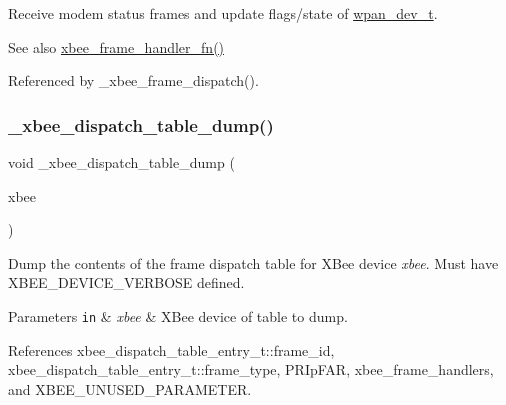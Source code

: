 Receive modem status frames and update flags/state of \hyperlink{structwpan__dev__t}{wpan\+\_\+dev\+\_\+t}. 

\begin{DoxySeeAlso}{See also}
\hyperlink{group__xbee__device_ga3e6f2b540e8cec7a69ef0b0166da14ff}{xbee\+\_\+frame\+\_\+handler\+\_\+fn()} 
\end{DoxySeeAlso}


Referenced by \+\_\+xbee\+\_\+frame\+\_\+dispatch().

\mbox{\label{group__xbee__device_gac7c192386ffce72242c2c8494b261491}} 
\subsubsection{\texorpdfstring{\+\_\+xbee\+\_\+dispatch\+\_\+table\+\_\+dump()}{\_xbee\_dispatch\_table\_dump()}}
{\footnotesize\ttfamily void \+\_\+xbee\+\_\+dispatch\+\_\+table\+\_\+dump (\begin{DoxyParamCaption}\item[{const \hyperlink{structxbee__dev__t}{xbee\+\_\+dev\+\_\+t} $\ast$}]{xbee }\end{DoxyParamCaption})}

Dump the contents of the frame dispatch table for X\+Bee device {\itshape xbee}. Must have X\+B\+E\+E\+\_\+\+D\+E\+V\+I\+C\+E\+\_\+\+V\+E\+R\+B\+O\+SE defined.


\begin{DoxyParams}[1]{Parameters}
\mbox{\tt in}  & {\em xbee} & X\+Bee device of table to dump. \\
\hline
\end{DoxyParams}


References xbee\+\_\+dispatch\+\_\+table\+\_\+entry\+\_\+t\+::frame\+\_\+id, xbee\+\_\+dispatch\+\_\+table\+\_\+entry\+\_\+t\+::frame\+\_\+type, P\+R\+Ip\+F\+AR, xbee\+\_\+frame\+\_\+handlers, and X\+B\+E\+E\+\_\+\+U\+N\+U\+S\+E\+D\+\_\+\+P\+A\+R\+A\+M\+E\+T\+ER.

\mbox{\label{group__xbee__device_gab386cd9e1afe784ab79b3139fe8fc5c8}} 
